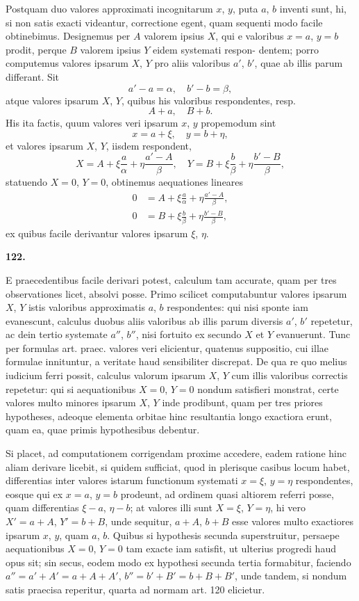 \documentclass[12pt,a4paper]{article}
\begin{document}
Postquam duo valores approximati incognitarum $x$, $y$, puta $a$, $b$ inventi
sunt, hi, si non satis exacti videantur, correctione egent, quam sequenti modo
facile obtinebimus. Designemus per $A$ valorem ipsius $X$, qui e valoribus
$x = a$, $y = b$ prodit, perque $B$ valorem ipsius $Y$ eidem systemati respon-
dentem; porro computemus valores ipsarum $X$, $Y$ pro aliis valoribus $a'$, $b'$,
quae ab illis parum differant. Sit
\[
a' - a = \alpha, \quad b' - b = \beta,
\]
atque valores ipsarum $X$, $Y$, quibus his valoribus respondentes, resp.
\[
A + a, \quad B + b.
\]
His ita factis, quum valores veri ipsarum $x$, $y$ propemodum sint
\[
x = a + \xi, \quad y = b + \eta,
\]
et valores ipsarum $X$, $Y$, iisdem respondent,
\[
X = A + \xi\frac{a}{\alpha} + \eta\frac{a' - A}{\beta}, \quad
Y = B + \xi\frac{b}{\beta} + \eta\frac{b' - B}{\beta},
\]
statuendo $X = 0$, $Y = 0$, obtinemus aequationes lineares
\begin{align*}
0 &= A + \xi\frac{a}{\alpha} + \eta\frac{a' - A}{\beta}, \\
0 &= B + \xi\frac{b}{\beta} + \eta\frac{b' - B}{\beta},
\end{align*}
ex quibus facile derivantur valores ipsarum $\xi$, $\eta$.

\bigskip
\noindent\textbf{122.}

E praecedentibus facile derivari potest, calculum tam accurate, quam per
tres observationes licet, absolvi posse. Primo scilicet computabuntur valores
ipsarum $X$, $Y$ istis valoribus approximatis $a$, $b$ respondentes: qui nisi sponte
iam evanescunt, calculus duobus aliis valoribus ab illis parum diversis $a'$, $b'$
repetetur, ac dein tertio systemate $a''$, $b''$, nisi fortuito ex secundo $X$ et $Y$
evanuerunt. Tunc per formulas art. praec. valores veri elicientur, quatenus
suppositio, cui illae formulae innituntur, a veritate haud sensibiliter discrepat.
De qua re quo melius iudicium ferri possit, calculus valorum ipsarum $X$, $Y$
cum illis valoribus correctis repetetur: qui si aequationibus $X = 0$, $Y = 0$
nondum satisfieri monstrat, certe valores multo minores ipsarum $X$, $Y$ inde
prodibunt, quam per tres priores hypotheses, adeoque elementa orbitae hinc
resultantia longo exactiora erunt, quam ea, quae primis hypothesibus debentur.

Si placet, ad computationem corrigendam proxime accedere, eadem ratione
hinc aliam derivare licebit, si quidem sufficiat, quod in plerisque casibus locum
habet, differentias inter valores istarum functionum systemati $x = \xi$, $y = \eta$
respondentes, eosque qui ex $x = a$, $y = b$ prodeunt, ad ordinem quasi altiorem
referri posse, quam differentias $\xi - a$, $\eta - b$; at valores illi sunt $X = \xi$,
$Y = \eta$, hi vero $X' = a + A$, $Y' = b + B$, unde sequitur, $a + A$, $b + B$
esse valores multo exactiores ipsarum $x$, $y$, quam $a$, $b$. Quibus si hypothesis
secunda superstruitur, persaepe aequationibus $X = 0$, $Y = 0$ tam exacte iam
satisfit, ut ulterius progredi haud opus sit; sin secus, eodem modo ex hypothesi
secunda tertia formabitur, faciendo $a'' = a' + A' = a + A + A'$,
$b'' = b' + B' = b + B + B'$, unde tandem, si nondum satis praecisa
reperitur, quarta ad normam art. 120 elicietur.
\end{document}

